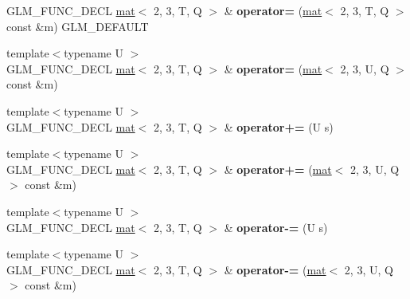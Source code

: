 \begin{DoxyCompactItemize}
\mbox{\label{structglm_1_1mat_3_012_00_013_00_01T_00_01Q_01_4_aef6739e6605932a7a837b4ae34e9f5b1}} 
G\+L\+M\+\_\+\+F\+U\+N\+C\+\_\+\+D\+E\+CL \hyperlink{structglm_1_1mat}{mat}$<$ 2, 3, T, Q $>$ \& {\bfseries operator=} (\hyperlink{structglm_1_1mat}{mat}$<$ 2, 3, T, Q $>$ const \&m) G\+L\+M\+\_\+\+D\+E\+F\+A\+U\+LT
\item 
\mbox{\label{structglm_1_1mat_3_012_00_013_00_01T_00_01Q_01_4_a24d7136d1ab9b00e10fadfada213d854}} 
{\footnotesize template$<$typename U $>$ }\\G\+L\+M\+\_\+\+F\+U\+N\+C\+\_\+\+D\+E\+CL \hyperlink{structglm_1_1mat}{mat}$<$ 2, 3, T, Q $>$ \& {\bfseries operator=} (\hyperlink{structglm_1_1mat}{mat}$<$ 2, 3, U, Q $>$ const \&m)
\item 
\mbox{\label{structglm_1_1mat_3_012_00_013_00_01T_00_01Q_01_4_a7b22ff32851ed8d087a0e90a78832ff6}} 
{\footnotesize template$<$typename U $>$ }\\G\+L\+M\+\_\+\+F\+U\+N\+C\+\_\+\+D\+E\+CL \hyperlink{structglm_1_1mat}{mat}$<$ 2, 3, T, Q $>$ \& {\bfseries operator+=} (U s)
\item 
\mbox{\label{structglm_1_1mat_3_012_00_013_00_01T_00_01Q_01_4_af7b5ca79c3075e5a7901b171e627da84}} 
{\footnotesize template$<$typename U $>$ }\\G\+L\+M\+\_\+\+F\+U\+N\+C\+\_\+\+D\+E\+CL \hyperlink{structglm_1_1mat}{mat}$<$ 2, 3, T, Q $>$ \& {\bfseries operator+=} (\hyperlink{structglm_1_1mat}{mat}$<$ 2, 3, U, Q $>$ const \&m)
\item 
\mbox{\label{structglm_1_1mat_3_012_00_013_00_01T_00_01Q_01_4_a4c46929ac7d9b4f097b562df470f892c}} 
{\footnotesize template$<$typename U $>$ }\\G\+L\+M\+\_\+\+F\+U\+N\+C\+\_\+\+D\+E\+CL \hyperlink{structglm_1_1mat}{mat}$<$ 2, 3, T, Q $>$ \& {\bfseries operator-\/=} (U s)
\item 
\mbox{\label{structglm_1_1mat_3_012_00_013_00_01T_00_01Q_01_4_a61e885feef91901245c2b7d7e518b90f}} 
{\footnotesize template$<$typename U $>$ }\\G\+L\+M\+\_\+\+F\+U\+N\+C\+\_\+\+D\+E\+CL \hyperlink{structglm_1_1mat}{mat}$<$ 2, 3, T, Q $>$ \& {\bfseries operator-\/=} (\hyperlink{structglm_1_1mat}{mat}$<$ 2, 3, U, Q $>$ const \&m)

\end{DoxyCompactItemize}
